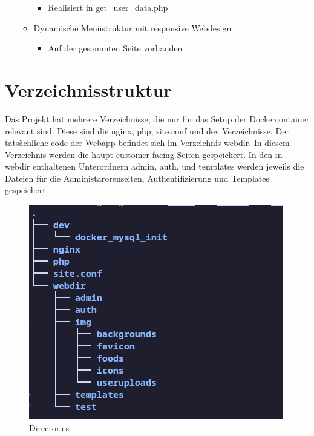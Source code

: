 \documentclass{article}
\begin{document}
\begin{itemize}
\begin{itemize}
            \begin{itemize}
                \item Realisiert in get\_user\_data.php
            \end{itemize}
        \item Dynamische Menüstruktur mit responsive Webdesign\\
            \begin{itemize}
                \item Auf der gesammten Seite vorhanden
            \end{itemize}
    \end{itemize}
\end{itemize}
\label{tab:my_label}

\section{Verzeichnisstruktur}
Das Projekt hat mehrere Verzeichnisse, die nur für das Setup der Dockercontainer relevant sind. Diese sind die nginx, php, site.conf und dev Verzeichnisse. Der tatsächliche code der Webapp befindet sich im Verzeichnis webdir. In diesem Verzeichnis werden die haupt customer-facing Seiten gespeichert. In den in webdir enthaltenen Unterordnern admin, auth, und templates werden jeweils die Dateien für die Administarorenseiten, Authentifizierung und Templates gespeichert.

\begin{figure}[!hbt]
    \centering
    \includegraphics[scale=0.75, width=\textwidth]{Pictures/Dirs1.png}
    \caption{Directories}
    \label{fig:sfig1}
\end{figure}
\end{document}
